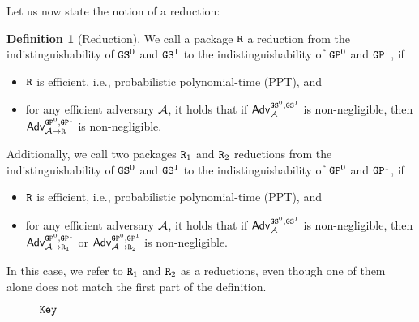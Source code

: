 \documentclass[a4paper,table,dvipsnames]{article}
\theoremstyle{definition}
\newtheorem{definition}{Definition}[section]
\newcommand{\M}[1]{\ensuremath{\text{\texttt{#1}}}}
\renewcommand{\O}[1]{\ensuremath{\mathsf{#1}}}
\begin{document}
Let us now state the notion of a reduction:
\begin{definition}[Reduction]
We call a package $\M{R}$ a reduction from the indistinguishability of $\M{GS}^0$ and  $\M{GS}^1$ to the indistinguishability of 
$\M{GP}^0$ and  $\M{GP}^1$, if
\begin{itemize}
\item $\M{R}$ is efficient, i.e., probabilistic polynomial-time (PPT), and
\item for any efficient adversary $\mathcal{A}$, it holds that if $\mathsf{Adv}^{\M{GS}^0,\M{GS}^1}_\adv$ is non-negligible, then
      $\mathsf{Adv}^{\M{GP}^0,\M{GP}^1}_{\adv\rightarrow\M{R}}$ is non-negligible.
\end{itemize}
Additionally, we call two packages $\M{R}_1$ and $\M{R}_2$ reductions from the indistinguishability of $\M{GS}^0$ and  $\M{GS}^1$ to the indistinguishability of 
$\M{GP}^0$ and  $\M{GP}^1$, if
\begin{itemize}
\item $\M{R}$ is efficient, i.e., probabilistic polynomial-time (PPT), and
\item for any efficient adversary $\mathcal{A}$, it holds that if $\mathsf{Adv}^{\M{GS}^0,\M{GS}^1}_\adv$ is non-negligible, then
      $\mathsf{Adv}^{\M{GP}^0,\M{GP}^1}_{\adv\rightarrow\M{R}_1}$ or $\mathsf{Adv}^{\M{GP}^0,\M{GP}^1}_{\adv\rightarrow\M{R}_2}$ is non-negligible.
\end{itemize}
In this case, we refer to $\M{R}_1$ and $\M{R}_2$ as a reductions, even though one of them alone does not match the first
part of the definition.
\end{definition}

\begin{wrapfigure}{R}{0.28\textwidth}
\vspace{-0.3cm}
		\begin{pcvstack}
		\underline{\underline{$\M{Key}$}}\\
                                \\
		\procedure{$\O{GET}()$}{
			\pcif k=\bot:\\
			\pcind k\sample \bin^\lambda\\
			\pcreturn k}
			\pcvspace
										\pcvspace
		\end{pcvstack}
\vspace{-0.5cm}
\end{wrapfigure}
\end{document}
